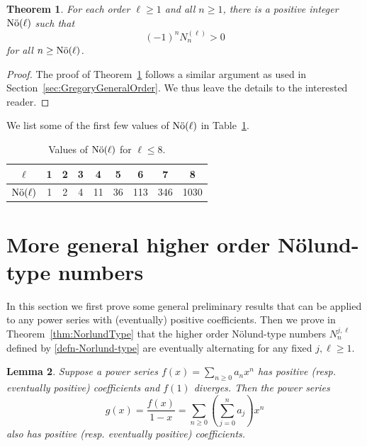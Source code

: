 \documentclass[11pt]{article}
\DeclareMathOperator{\Nor}{\text{\rm N\"o}}
\theoremstyle{plain}
\newtheorem{thm}{Theorem}[section]
\newtheorem{lem}[thm]{Lemma}
\theoremstyle{definition}
\begin{document}
\begin{thm}\label{thm:Norlund2}
For each order $\ell\ge 1$ and all $n\ge 1$, there is a positive integer $\Nor(\ell)$ such that
\begin{equation*}
(-1)^{n} N_n^{(\ell)}>0
\end{equation*}
for all $n\ge \Nor(\ell)$.
\end{thm}

\begin{proof}
The proof of Theorem~\ref{thm:Norlund2} follows
a similar argument as used in Section~\ref{sec:GregoryGeneralOrder}. We thus leave the details to the interested reader.
\end{proof}

We list some of the first few values of $\Nor(\ell)$ in Table~\ref{tbl:NewNorBound}.

\begin{table}[h]
\centering\begin{tabular}{|c|c|c|c|c|c|c|c|c|}
\hline
$\ell$ & 1 & 2 &3 & 4 & 5 & 6 & 7 & 8   \\
\hline
$\Nor(\ell)$ &
1 & 2 & 4  & 11  &  36 &  113 &  346  & 1030    \\
\hline
\end{tabular}
\caption{Values of $\Nor(\ell)$ for $\ell\le 8$.}
\label{tbl:NewNorBound}
\end{table}

\section{More general higher order N\"olund-type numbers}\label{sec:NorlundGeneral}
In  this section we first prove some general preliminary results that can be applied to any power series with (eventually) positive coefficients. Then we prove in Theorem~\ref{thm:NorlundType} that the higher order N\"olund-type numbers $N_n^{j,\ell}$ defined by \eqref{defn-Norlund-type} are eventually alternating for any fixed $j,\ell\ge 1$.

\begin{lem}\label{lem:eventualPos}
Suppose a power series $f(x)=\sum_{n\ge 0} a_n x^n$ has positive (resp. eventually positive) coefficients and $f(1)$ diverges. Then
the power series
\begin{equation*}
g(x)=\frac{f(x)}{1-x}= \sum_{n\ge 0} \left(\sum_{j=0}^n a_j \right) x^n
\end{equation*}
also has positive (resp. eventually positive) coefficients.
\end{lem}
\end{document}
